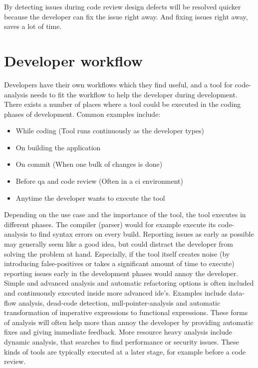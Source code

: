 \documentclass[pdftex,10pt,b5paper,twoside]{report}
\begin{document}
By detecting issues during code review design defects will be resolved quicker because the developer can fix the issue right away. And fixing issues right away, saves a lot of time.

\section{Developer workflow}

Developers have their own workflows which they find useful, and a tool for code-analysis needs to fit the workflow to help the developer during development. There exists a number of places where a tool could be executed in the coding phases of development. Common examples include:
\begin{itemize}
    \item While coding (Tool runs continuously as the developer types)
    \item On building the application 
    \item On commit (When one bulk of changes is done)
    \item Before \gls{qa} and code review (Often in a \gls{ci} environment)
    \item Anytime the developer wants to execute the tool
\end{itemize}

Depending on the use case and the importance of the tool, the tool executes in different phases. The compiler (parser) would for example execute its code-analysis to find syntax errors on every build. Reporting issues as early as possible may generally seem like a good idea, but could distract the developer from solving the problem at hand. Especially, if the tool itself creates noise (by introducing false-positives or takes a significant amount of time to execute) reporting issues early in the development phases would annoy the developer. Simple and advanced analysis and automatic refactoring options is often included and continuously executed inside more advanced \gls{ide}'s. Examples include data-flow analysis, dead-code detection, null-pointer-analysis and automatic transformation of imperative expressions to functional expressions. These forms of analysis will often help more than annoy the developer by providing automatic fixes and giving immediate feedback. More resource heavy analysis include dynamic analysis, that searches to find performance or security issues. These kinds of tools are typically executed at a later stage, for example before a code review.
\end{document}
